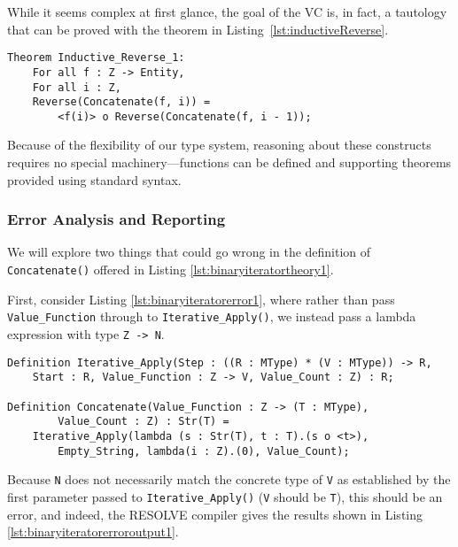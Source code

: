 

While it seems complex at first glance, the goal of the VC is, in fact, a tautology that can be proved with the theorem in Listing~\ref{lst:inductiveReverse}.

\begin{lstlisting}[float=h,language=resolve,caption={A theorem about \texttt{Reverse()}\label{lst:inductiveReverse}}]
Theorem Inductive_Reverse_1:
	For all f : Z -> Entity,
	For all i : Z,
	Reverse(Concatenate(f, i)) = 
		<f(i)> o Reverse(Concatenate(f, i - 1));
\end{lstlisting}

Because of the flexibility of our type system, reasoning about these constructs requires no special machinery---functions can be defined and supporting theorems provided using standard syntax.

		\subsubsection{Error Analysis and Reporting}	

We will explore two things that could go wrong in the definition of \texttt{Concatenate()} offered in Listing \ref{lst:binaryiteratortheory1}.

First, consider Listing \ref{lst:binaryiteratorerror1}, where rather than pass \texttt{Value\_Function} through to \texttt{Iterative\_Apply()}, we instead pass a lambda expression with type \texttt{Z -> N}.

\begin{lstlisting}[float=h,language=resolve,caption={Passing an incorrectly-typed \texttt{Value\_Function}\label{lst:binaryiteratorerror1}}]
Definition Iterative_Apply(Step : ((R : MType) * (V : MType)) -> R,
	Start : R, Value_Function : Z -> V, Value_Count : Z) : R;

Definition Concatenate(Value_Function : Z -> (T : MType), 
		Value_Count : Z) : Str(T) = 
	Iterative_Apply(lambda (s : Str(T), t : T).(s o <t>),
		Empty_String, lambda(i : Z).(0), Value_Count);
\end{lstlisting}

Because \texttt{N} does not necessarily match the concrete type of \texttt{V} as established by the first parameter passed to \texttt{Iterative\_Apply()} (\texttt{V} should be \texttt{T}), this should be an error, and indeed, the RESOLVE compiler gives the results shown in Listing \ref{lst:binaryiteratorerroroutput1}.

